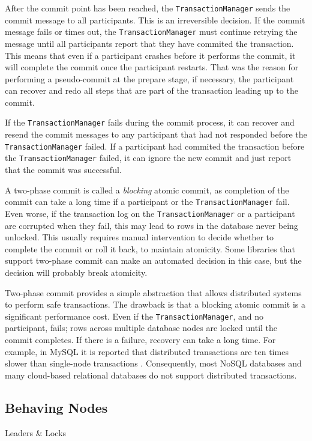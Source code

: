 After the commit point has been reached, the \texttt{TransactionManager} sends the commit message to all participants.
This is an irreversible decision.
If the commit message fails or times out, the \texttt{TransactionManager} must continue retrying the message
until all participants report that they have commited the transaction.
This means that even if a participant crashes before it performs the commit, it will complete the commit once the participant restarts.
That was the reason for performing a pseudo-commit at the prepare stage,
if necessary, the participant can recover and redo all steps that are part of the transaction leading up to the commit.

If the \texttt{TransactionManager} fails during the commit process,
it can recover and resend the commit messages to any participant that had not responded before the \texttt{TransactionManager} failed.
If a participant had commited the transaction before the \texttt{TransactionManager} failed,
it can ignore the new commit and just report that the commit was successful.

A two-phase commit is called a \emph{blocking} atomic commit,
as completion of the commit can take a long time if a participant or the \texttt{TransactionManager} fail.
Even worse, if the transaction log on the \texttt{TransactionManager} or a participant are corrupted when they fail,
this may lead to rows in the database never being unlocked.
This usually requires manual intervention to decide whether to complete the commit or roll it back, to maintain atomicity.
Some libraries that support two-phase commit can make an automated decision in this case,
but the decision will probably break atomicity.

Two-phase commit provides a simple abstraction that allows distributed systems to perform safe transactions.
The drawback is that a blocking atomic commit is a significant performance cost.
Even if the \texttt{TransactionManager}, and no participant, fails;
rows across multiple database nodes are locked until the commit completes.
If there is a failure, recovery can take a long time.
For example, in MySQL it is reported that distributed transactions are ten times slower than single-node transactions \cite{distrib-mysql}.
Consequently, most NoSQL databases and many cloud-based relational databases do not support distributed transactions.

\subsection{Behaving Nodes}
Leaders \& Locks

